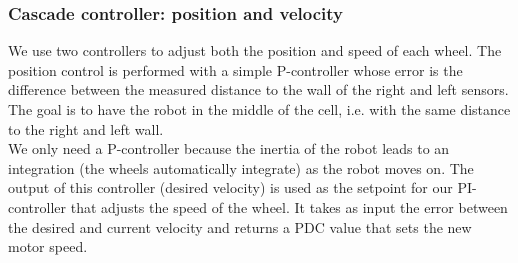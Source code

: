 \subsubsection{Cascade controller: position and velocity}

We use two controllers to adjust both the position and speed of each wheel. 
\vskip 0.1in
\noindent
The position control is performed with a simple P-controller whose error is the difference between the measured distance to the wall of the right and left sensors. The goal is to have the robot in the middle of the cell, i.e. with the same distance to the right and left wall.\\
We only need a P-controller because the inertia of the robot leads to an integration (the wheels automatically integrate) as the robot moves on.
\vskip 0.1in
\noindent
The output of this controller (desired velocity) is used as the setpoint for our PI-controller that adjusts the speed of the wheel. It takes as input the error between the desired and current velocity and returns a PDC value that sets the new motor speed.
